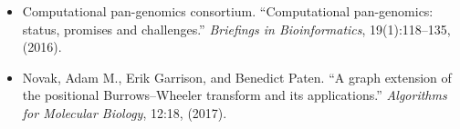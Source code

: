 \documentclass[a4paper,12pt,numbered,oneside]{Classes/PhDThesisPSnPDF}
\begin{document}
\begin{appendices}
\begin{itemize}[noitemsep]
\item Computational pan-genomics consortium. ``Computational pan-genomics: status, promises and challenges.'' \emph{Briefings in Bioinformatics}, 19(1):118--135, (2016).

\item Novak, Adam M., Erik Garrison, and Benedict Paten. ``A graph extension of the positional Burrows–Wheeler transform and its applications.'' \emph{Algorithms for Molecular Biology}, 12:18, (2017).

\end{itemize}

%

\end{appendices}

\printthesisindex %
\end{document}

